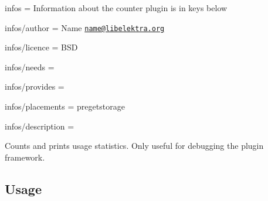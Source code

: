 
\begin{DoxyItemize}
\item infos = Information about the counter plugin is in keys below
\item infos/author = Name \href{mailto:name@libelektra.org}{\tt name@libelektra.\+org}
\item infos/licence = B\+S\+D
\item infos/needs =
\item infos/provides =
\item infos/placements = pregetstorage
\item infos/description =
\end{DoxyItemize}

Counts and prints usage statistics. Only useful for debugging the plugin framework.

\subsection*{Usage}